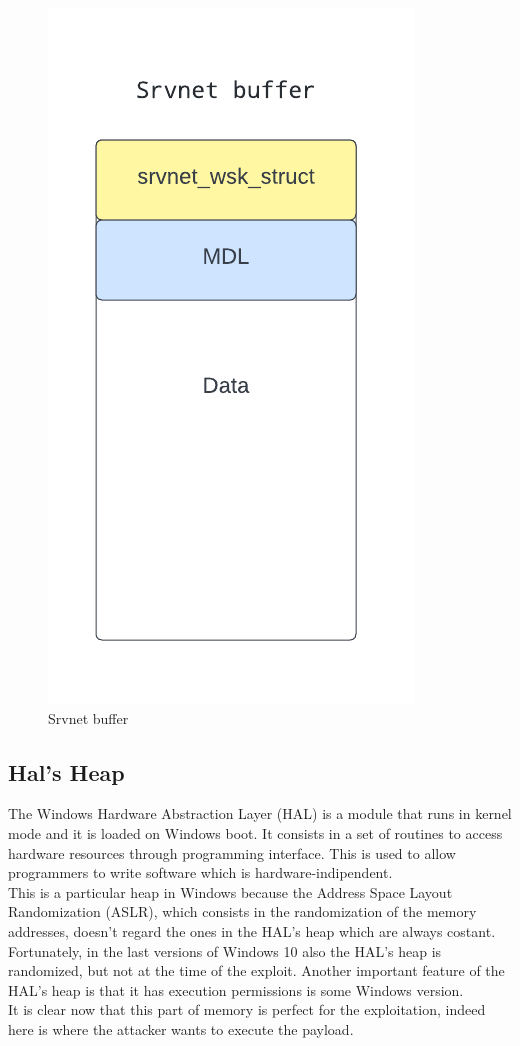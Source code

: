 \begin{figure}[ht!]
    \centering
      \includegraphics[scale=0.7]{images/srvnet_buffer.png}
      \caption{Srvnet buffer}
\end{figure}

\clearpage

\subsection{Hal's Heap}
The Windows Hardware Abstraction Layer (HAL) is a module that runs in kernel mode and it is loaded on Windows boot. It consists in a set of routines to access hardware resources
through programming interface. This is used to allow programmers to write software which is hardware-indipendent.\\
This is a particular heap in Windows because the Address Space Layout Randomization (ASLR), which consists in the randomization of the memory addresses,
doesn't regard the ones in the HAL's heap which are always costant.
Fortunately, in the last versions of Windows 10 also the HAL's heap is randomized, but not at the time of the exploit.
Another important feature of the HAL's heap is that it has execution permissions is some Windows version.\\
It is clear now that this part of memory is perfect for the exploitation, indeed here is where the attacker wants to execute the payload.

